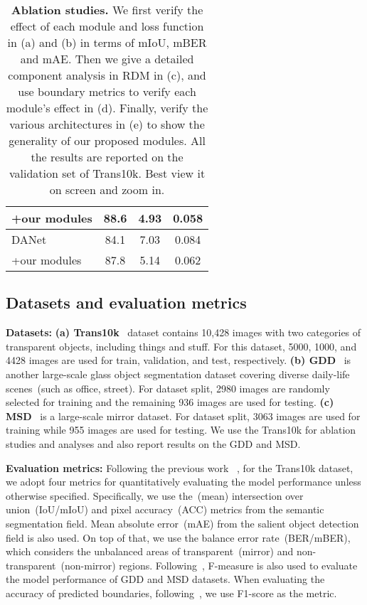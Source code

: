 \begin{table*}[t]
\begin{minipage}[!t]{\linewidth}
\begin{minipage}{.25\linewidth}
{{\begin{tabular}{l|c c c}
				\hline
				+our modules & 88.6 & 4.93 &  0.058 \\
				\hline
				DANet~\cite{DAnet} & 84.1 & 7.03 & 0.084 \\
				\hline
				+our modules & 87.8 & 5.14 & 0.062\\
				\hline
		\end{tabular}}}
		\end{minipage}
	\end{minipage}
	\vspace{-3mm}
	\caption{\small \textbf{Ablation studies.} We first verify the effect of each module and loss function in (a) and (b) in terms of mIoU, mBER and mAE. Then we give a detailed component analysis in RDM in (c), and use boundary metrics to verify each module's effect in (d). Finally, verify the various architectures in (e) to show the generality of our proposed modules. All the results are reported on the validation set of Trans10k. Best view it on screen and zoom in.}\label{tab:ablations}
	\vspace{-3mm}
\end{table*}



\subsection{Datasets and evaluation metrics}

\noindent \textbf{Datasets:} \textbf{(a) Trans10k}~\cite{trans10k_xieenze} dataset contains 10,428 images with two categories of transparent objects, including things and stuff. For this dataset, 5000, 1000, and 4428 images are used for train, validation, and test, respectively. 
\textbf{(b) GDD}~\cite{tranparent_gdnet} is another large-scale glass object segmentation dataset covering diverse daily-life scenes~(such as office, street). For dataset split, 2980 images are randomly selected for training and the remaining 936 images are used for testing.
\textbf{(c) MSD}~\cite{Mirror_net} is a large-scale mirror dataset. For dataset split, 3063 images are used for training while 955 images are used for testing.
We use the Trans10k for ablation studies and analyses and also report results on the GDD and MSD.

\noindent \textbf{Evaluation metrics:} Following the previous work~\cite{trans10k_xieenze, tranparent_gdnet, Mirror_net} , for the Trans10k dataset, we adopt four metrics for quantitatively evaluating the model performance unless otherwise specified. Specifically, we use the~(mean) intersection over union~(IoU/mIoU) and pixel accuracy~(ACC) metrics from the semantic segmentation field. Mean absolute error~(mAE) from the salient object detection field is also used. On top of that, we use the balance error rate~(BER/mBER), which considers the unbalanced areas of transparent~(mirror) and non-transparent~(non-mirror) regions. Following~\cite{tranparent_gdnet, Mirror_net}, F-measure is also used to evaluate the model performance of GDD and MSD datasets. When evaluating the accuracy of predicted boundaries, following~\cite{gated-scnn}, we use F1-score as the metric.

